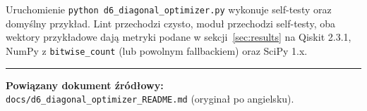 \documentclass[11pt,a4paper]{article}
\newcommand{\1}{\mathbf{1}}
\newcommand{\code}[1]{\texttt{#1}}
\begin{document}
\noindent
Uruchomienie \code{python d6\_diagonal\_optimizer.py} wykonuje
self-testy oraz domyślny przykład. Lint przechodzi czysto, moduł
przechodzi self-testy, oba wektory przykładowe dają metryki podane w
sekcji~\ref{sec:results} na Qiskit 2.3.1, NumPy z \code{bitwise\_count}
(lub powolnym fallbackiem) oraz SciPy 1.x.

\bigskip\hrule\bigskip
\noindent
\textbf{Powiązany dokument źródłowy:} \\
\code{docs/d6\_diagonal\_optimizer\_README.md} (oryginał po angielsku).
\end{document}
